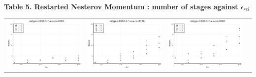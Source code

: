 \documentclass{article}
\begin{document}
    \begin{landscape}
    \begin{center}
    \textbf{Table 5. Restarted Nesterov Momentum : number of stages against $\epsilon_{rel}$}
    \begin{longtable}{| c | c | c | c |}
    \hline
\includegraphics[height=0.22\textheight]{hiter_fixlim_netgen-1000-1-_-a-a-ns-0000.png} &
\includegraphics[height=0.22\textheight]{hiter_fixlim_netgen-1000-1-_-a-a-ns-0330.png} &
\includegraphics[height=0.22\textheight]{hiter_fixlim_netgen-1000-1-_-a-a-ns-0660.png} &

\end{longtable}
\end{center}
\end{landscape}
\end{document}
